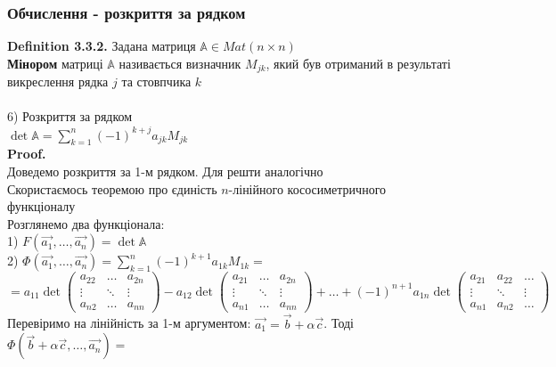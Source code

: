 \documentclass[a4paper, 14pt]{extarticle}
\def\huge{\displaystyle}
\def\defin#1{\textbf{Definition {#1}}}
\def\proof{\textbf{Proof.}\\}
\begin{document}
\subsubsection*{Обчислення - розкриття за рядком}
\defin{3.3.2.} Задана матриця $\mathbb{A} \in Mat(n \times n)$\\
\textbf{Мінором} матриці $\mathbb{A}$ називається визначник $M_{jk}$, який був отриманий в результаті викреслення рядка $j$ та стовпчика $k$\\
\\
6) Розкриття за рядком \\
$\det \mathbb{A} = \huge \sum_{k=1}^n (-1)^{k+j} a_{jk}M_{jk}$\\
\proof
Доведемо розкриття за 1-м рядком. Для решти аналогічно\\
Скористаємось теоремою про єдиність $n$-лінійного кососиметричного функціоналу\\
Розглянемо два функціонала:\\
1) $F(\vec{a_1},\dots, \vec{a_n}) = \det \mathbb{A}$\\
2) $\Phi(\vec{a_1},\dots, \vec{a_n}) = \huge \sum_{k=1}^n (-1)^{k+1} a_{1k}M_{1k} =$\\
\hspace*{-2cm}
$= a_{11} \det \begin{pmatrix} a_{22} & \dots & a_{2n} \\ \vdots & \ddots & \vdots \\ a_{n2} & \dots & a_{nn} \end{pmatrix} - a_{12} \det \begin{pmatrix} a_{21} & \dots & a_{2n} \\ \vdots & \ddots & \vdots \\ a_{n1} & \dots & a_{nn} \end{pmatrix} + \dots + (-1)^{n+1} a_{1n} \det \begin{pmatrix} a_{21} & a_{22} & \dots \\ \vdots & \ddots & \vdots \\ a_{n1} & a_{n2} & \dots \end{pmatrix}$\\
Перевіримо на лінійність за 1-м аргументом: $\vec{a_1} = \vec{b} + \alpha \vec{c}$. Тоді\\
$\Phi(\vec{b}+\alpha \vec{c},\dots,\vec{a_n}) =$ \\
\end{document}

